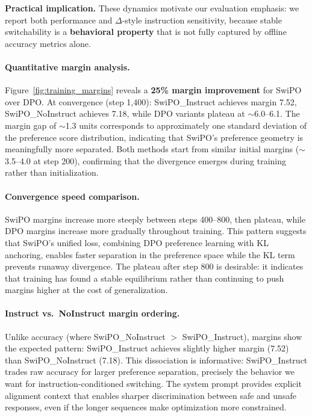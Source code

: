 \vspace{-0.2em}
\noindent\textbf{Practical implication.}
These dynamics motivate our evaluation emphasis:
we report both performance and $\Delta$-style instruction sensitivity, because stable switchability is a \textbf{behavioral property} that is not fully captured by offline accuracy metrics alone.

\paragraph{Quantitative margin analysis.}
Figure~\ref{fig:training_margins} reveals a \textbf{25\% margin improvement} for SwiPO over DPO.
At convergence (step 1,400): SwiPO\_Instruct achieves margin 7.52, SwiPO\_NoInstruct achieves 7.18, while DPO variants plateau at $\sim$6.0--6.1.
The margin gap of $\sim$1.3 units corresponds to approximately one standard deviation of the preference score distribution, indicating that SwiPO's preference geometry is meaningfully more separated.
Both methods start from similar initial margins ($\sim$3.5--4.0 at step 200), confirming that the divergence emerges during training rather than initialization.

\paragraph{Convergence speed comparison.}
SwiPO margins increase more steeply between steps 400--800, then plateau, while DPO margins increase more gradually throughout training.
This pattern suggests that SwiPO's unified loss, combining DPO preference learning with KL anchoring, enables faster separation in the preference space while the KL term prevents runaway divergence.
The plateau after step 800 is desirable: it indicates that training has found a stable equilibrium rather than continuing to push margins higher at the cost of generalization.

\paragraph{Instruct vs.\ NoInstruct margin ordering.}
Unlike accuracy (where SwiPO\_NoInstruct $>$ SwiPO\_Instruct), margins show the expected pattern: SwiPO\_Instruct achieves slightly higher margin (7.52) than SwiPO\_NoInstruct (7.18).
This dissociation is informative: SwiPO\_Instruct trades raw accuracy for larger preference separation, precisely the behavior we want for instruction-conditioned switching.
The system prompt provides explicit alignment context that enables sharper discrimination between safe and unsafe responses, even if the longer sequences make optimization more constrained.








